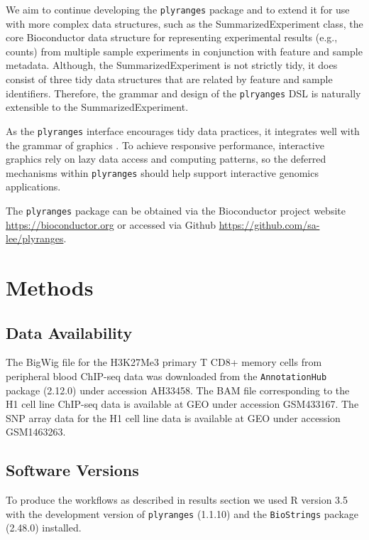 \documentclass[]{article}
\begin{document}
We aim to continue developing the \texttt{plyranges} package and to
extend it for use with more complex data structures, such as the
SummarizedExperiment class, the core Bioconductor data structure for
representing experimental results (e.g., counts) from multiple sample
experiments in conjunction with feature and sample metadata. Although,
the SummarizedExperiment is not strictly tidy, it does consist of three
tidy data structures that are related by feature and sample identifiers.
Therefore, the grammar and design of the \texttt{plryanges} DSL is
naturally extensible to the SummarizedExperiment.

As the \texttt{plyranges} interface encourages tidy data practices, it
integrates well with the grammar of graphics \cite{Wickham2016-gz}. To
achieve responsive performance, interactive graphics rely on lazy data
access and computing patterns, so the deferred mechanisms within
\texttt{plyranges} should help support interactive genomics
applications.

The \texttt{plyranges} package can be obtained via the Bioconductor
project website \url{https://bioconductor.org} or accessed via Github
\url{https://github.com/sa-lee/plyranges}.

\section{Methods}\label{methods}

\subsection{Data Availability}\label{data-availability}

The BigWig file for the H3K27Me3 primary T CD8+ memory cells from
peripheral blood ChIP-seq data was downloaded from the
\texttt{AnnotationHub} package (2.12.0) under accession AH33458. The BAM
file corresponding to the H1 cell line ChIP-seq data is available at GEO
under accession GSM433167. The SNP array data for the H1 cell line data
is available at GEO under accession GSM1463263.

\subsection{Software Versions}\label{software-versions}

To produce the workflows as described in results section we used R
version 3.5 with the development version of \texttt{plyranges} (1.1.10)
and the \texttt{BioStrings} package (2.48.0) installed.
\end{document}
